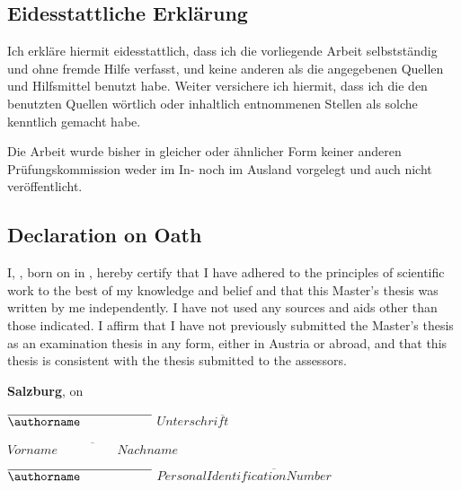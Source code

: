 
\ifhcilanguagegerman
\subsection*{Eidesstattliche Erklärung}

Ich erkläre hiermit eidesstattlich, dass ich die vorliegende Arbeit selbstständig und ohne fremde Hilfe verfasst, und keine anderen als die angegebenen Quellen und Hilfsmittel benutzt habe. Weiter versichere ich hiermit, dass ich die den benutzten Quellen wörtlich oder inhaltlich entnommenen Stellen als solche kenntlich gemacht habe.

Die Arbeit wurde bisher in gleicher oder ähnlicher Form keiner anderen Prüfungskommission weder im In- noch im Ausland vorgelegt und auch nicht veröffentlicht.


\else

\subsection*{Declaration on Oath}

I, \textbf{\authorname}, born on \textbf{\birthday} in \textbf{\birthplace}, hereby certify that I have adhered to the principles of scientific work to the best of my knowledge and belief and that this Master’s thesis was written by me independently. I have not used any sources and aids other than those indicated.
I affirm that I have not previously submitted the Master’s thesis as an examination thesis in any form, either in Austria or abroad, and that this thesis is consistent with the thesis submitted to the assessors.

\textbf{Salzburg}, on \textbf{\thesisdate}

\fi

\vspace*{3cm}



\hfill

\ifhcilanguagegerman
$\overline{\authorname \hspace{2cm}}$ \hfill $\overline{{Unterschrift}\hspace{2cm}}$

\vspace*{1cm}

\hfill $\overline{{Vorname\hspace{2cm}Nachname}}$
 
 \else
 $\overline{\authorname\hspace{2cm}}$ \hfill
 $\overline {Personal Identification Number \hspace{2cm}}$

 \fi

